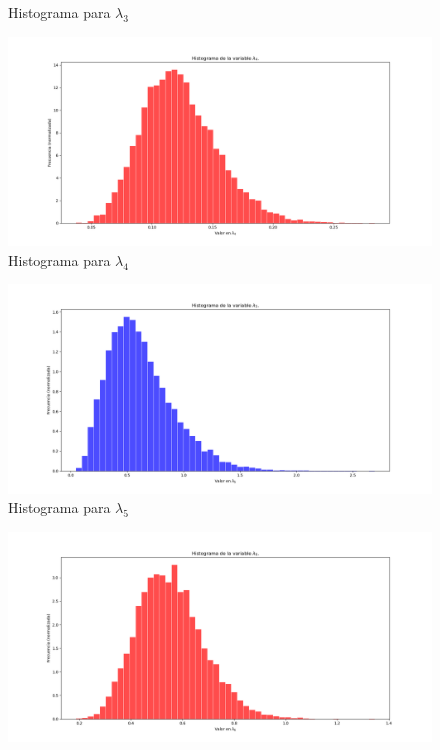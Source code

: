 \documentclass[letterpaper]{article}
\newcommand{\1}{\mathds{1}}
\theoremstyle{definition}
\theoremstyle{definition}
\theoremstyle{definition}
\theoremstyle{definition}
\theoremstyle{definition}
\begin{document}
\begin{itemize}
\begin{figure}[h!]
        \caption{Histograma para $\lambda_{3}$}
    \end{figure} 
    \begin{figure}[h!]
        \centering
        \includegraphics[width=\linewidth]{16.png}
        \caption{Histograma para $\lambda_{4}$}
    \end{figure} 
    \begin{figure}[h!]
        \centering
        \includegraphics[width=\linewidth]{17.png}
        \caption{Histograma para $\lambda_{5}$}
    \end{figure} 
    \begin{figure}[h!]
        \centering
        \includegraphics[width=\linewidth]{18.png}

\end{figure}
\end{itemize}
\end{document}
